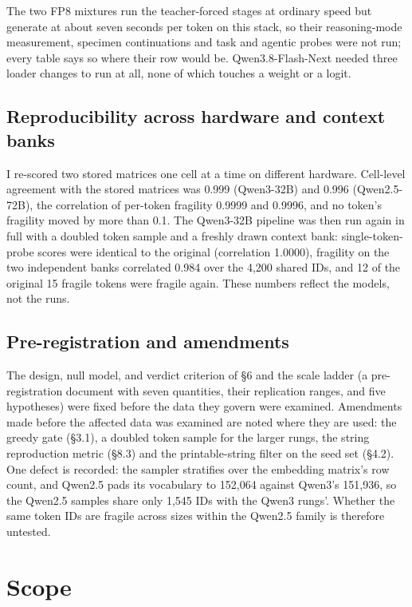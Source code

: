 \documentclass[11pt]{article}
\begin{document}
The two FP8 mixtures run the teacher-forced stages at ordinary speed but generate at about seven seconds per token on this stack, so their reasoning-mode measurement, specimen continuations and task and agentic probes were not run; every table says so where their row would be. Qwen3.8-Flash-Next needed three loader changes to run at all, none of which touches a weight or a logit.

\subsection{Reproducibility across hardware and context banks}\label{reproducibility-across-hardware-and-context-banks}

I re-scored two stored matrices one cell at a time on different hardware. Cell-level agreement with the stored matrices was 0.999 (Qwen3-32B) and 0.996 (Qwen2.5-72B), the correlation of per-token fragility 0.9999 and 0.9996, and no token's fragility moved by more than 0.1. The Qwen3-32B pipeline was then run again in full with a doubled token sample and a freshly drawn context bank: single-token-probe scores were identical to the original (correlation 1.0000), fragility on the two independent banks correlated 0.984 over the 4,200 shared IDs, and 12 of the original 15 fragile tokens were fragile again. These numbers reflect the models, not the runs.

\subsection{Pre-registration and amendments}\label{pre-registration-and-amendments}

The design, null model, and verdict criterion of §6 and the scale ladder (a pre-registration document with seven quantities, their replication ranges, and five hypotheses) were fixed before the data they govern were examined. Amendments made before the affected data was examined are noted where they are used: the greedy gate (§3.1), a doubled token sample for the larger rungs, the string reproduction metric (§8.3) and the printable-string filter on the seed set (§4.2). One defect is recorded: the sampler stratifies over the embedding matrix's row count, and Qwen2.5 pads its vocabulary to 152,064 against Qwen3's 151,936, so the Qwen2.5 samples share only 1,545 IDs with the Qwen3 rungs'. Whether the same token IDs are fragile across sizes within the Qwen2.5 family is therefore untested.

\section{Scope}\label{scope}
\end{document}
